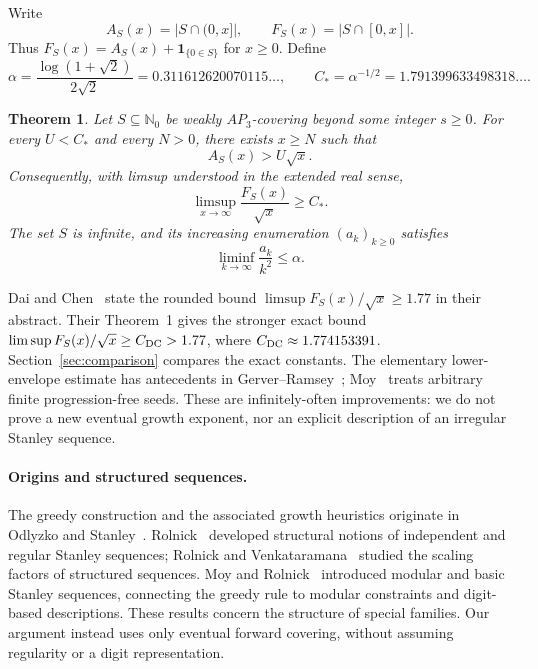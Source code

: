 \documentclass[11pt]{article}
\newtheorem{theorem}{Theorem}[section]
\theoremstyle{definition}\newtheorem{definition}[theorem]{Definition}
\theoremstyle{remark}\newtheorem{remark}[theorem]{Remark}
\numberwithin{equation}{section}
\newcommand{\N}{\mathbb N_0}
\newcommand{\al}{\alpha}
\newcommand{\Cs}{C_*}
\begin{document}
Write
\[
A_S(x)=|S\cap(0,x]|,\qquad F_S(x)=|S\cap[0,x]|.
\]
Thus $F_S(x)=A_S(x)+\mathbf1_{\{0\in S\}}$ for $x\ge0$. Define
\begin{equation}\label{eq:constants}
\al=\frac{\log(1+\sqrt2)}{2\sqrt2}=0.311612620070115\ldots,
\qquad \Cs=\al^{-1/2}=1.791399633498318\ldots.
\end{equation}

\begin{theorem}\label{thm:main}
Let $S\subseteq\N$ be weakly $AP_3$-covering beyond some integer $s\ge0$. For every $U<\Cs$ and every $N>0$, there exists $x\ge N$ such that
\[
A_S(x)>U\sqrt x.
\]
Consequently, with limsup understood in the extended real sense,
\[
\limsup_{x\to\infty}\frac{F_S(x)}{\sqrt x}\ge\Cs.
\]
The set $S$ is infinite, and its increasing enumeration $(a_k)_{k\ge0}$ satisfies
\[
\liminf_{k\to\infty}\frac{a_k}{k^2}\le\al.
\]
\end{theorem}

Dai and Chen~\cite{DC} state the rounded bound $\limsup F_S(x)/\sqrt x\ge1.77$ in their abstract. Their Theorem~1 gives the stronger exact bound $\limsup F_S(x)/\sqrt x\ge C_{\rm DC}>1.77$, where $C_{\rm DC}\approx1.774153391$. Section~\ref{sec:comparison} compares the exact constants. The elementary lower-envelope estimate has antecedents in Gerver--Ramsey~\cite{GR}; Moy~\cite{Moy} treats arbitrary finite progression-free seeds. These are infinitely-often improvements: we do not prove a new eventual growth exponent, nor an explicit description of an irregular Stanley sequence.

\paragraph{Origins and structured sequences.}
The greedy construction and the associated growth heuristics originate in
Odlyzko and Stanley~\cite{OS}. Rolnick~\cite{Rol} developed structural notions
of independent and regular Stanley sequences; Rolnick and
Venkataramana~\cite{RV} studied the scaling factors of structured sequences.
Moy and Rolnick~\cite{MR} introduced modular and basic Stanley sequences,
connecting the greedy rule to modular constraints and digit-based descriptions.
These results concern the structure of special families. Our argument instead
uses only eventual forward covering, without assuming regularity or a digit
representation.
\end{document}
